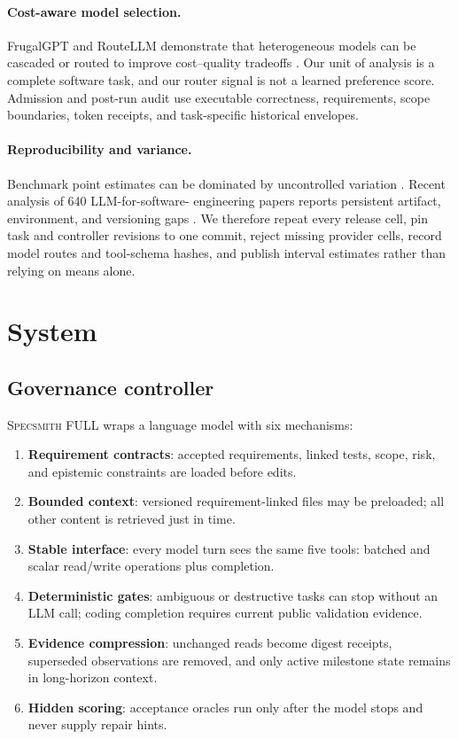\documentclass[10pt,twocolumn]{article}
\newcommand{\specsmith}{\textsc{Specsmith}}
\begin{document}
\paragraph{Cost-aware model selection.}
FrugalGPT and RouteLLM demonstrate that heterogeneous models can be cascaded or
routed to improve cost--quality tradeoffs \citep{chen2023frugalgpt,
ong2024routellm}. Our unit of analysis is a complete software task, and our
router signal is not a learned preference score. Admission and post-run audit
use executable correctness, requirements, scope boundaries, token receipts,
and task-specific historical envelopes.

\paragraph{Reproducibility and variance.}
Benchmark point estimates can be dominated by uncontrolled variation
\citep{bouthillier2021variance}. Recent analysis of 640 LLM-for-software-
engineering papers reports persistent artifact, environment, and versioning
gaps \citep{siddiq2025reproducibility}. We therefore repeat every release cell,
pin task and controller revisions to one commit, reject missing provider cells,
record model routes and tool-schema hashes, and publish interval estimates
rather than relying on means alone.

\section{System}

\subsection{Governance controller}

\specsmith{} FULL wraps a language model with six mechanisms:
\begin{enumerate}
  \item \textbf{Requirement contracts}: accepted requirements, linked tests,
        scope, risk, and epistemic constraints are loaded before edits.
  \item \textbf{Bounded context}: versioned requirement-linked files may be
        preloaded; all other content is retrieved just in time.
  \item \textbf{Stable interface}: every model turn sees the same five tools:
        batched and scalar read/write operations plus completion.
  \item \textbf{Deterministic gates}: ambiguous or destructive tasks can stop
        without an LLM call; coding completion requires current public
        validation evidence.
  \item \textbf{Evidence compression}: unchanged reads become digest receipts,
        superseded observations are removed, and only active milestone state
        remains in long-horizon context.
  \item \textbf{Hidden scoring}: acceptance oracles run only after the model
        stops and never supply repair hints.
\end{enumerate}
\end{document}

